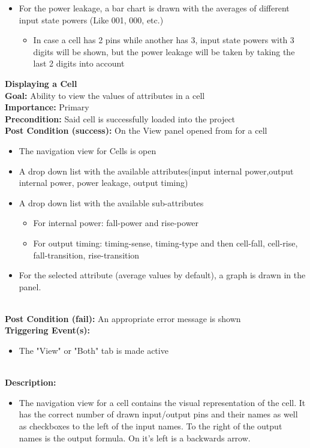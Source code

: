 \documentclass[10pt,a4paper]{report}
\newcommand{\precondition}[1]{
    \textbf{Precondition: } #1 \leavevmode \\
}
\newcommand{\FRDescription}[8]{
    \textbf{#1} \leavevmode \\
    \textbf{Goal: } #2 \leavevmode \\
    \textbf{Importance: } #3 \leavevmode \\
    \precondition{#4}
    \textbf{Post Condition (success): } #5 \leavevmode \\
    \textbf{Post Condition (fail): } #6 \leavevmode \\
    \textbf{Triggering Event(s): } #7 \leavevmode \\
    \textbf{Description: } \leavevmode \\ 
    #8}
\begin{document}
\begin{FR}
{\begin{itemize}
\begin{itemize}
            \item For the power leakage, a bar chart is drawn with the averages of different input state powers (Like 001, 000, etc.)
                \begin{itemize}
                    \item In case a cell has 2 pins while another has 3, input state powers with 3 digits will be shown, but the power leakage will be taken by taking the last 2 digits into account
                \end{itemize}
        \end{itemize}
    \end{itemize}}
    \item \FRDescription{Displaying a Cell}
    {Ability to view the values of attributes in a cell}
    {Primary}
    {Said cell is successfully loaded into the project}
    {On the View panel opened from \label{FR-PREVIOUS} for a cell
    \begin{itemize}
        \item The navigation view for Cells is open
        \item A drop down list with the available attributes(input internal power,output internal power, power leakage, output timing)
        \item A drop down list with the available sub-attributes
        \begin{itemize}
            \item For internal power: fall-power and rise-power
            \item For output timing: timing-sense, timing-type and then cell-fall, cell-rise, fall-transition, rise-transition
        \end{itemize}
        \item For the selected attribute (average values by default), a graph is drawn in the panel.
    \end{itemize}}
    {An appropriate error message is shown}
    {\begin{itemize}
        \item The "View" or "Both" tab is made active
    \end{itemize}}
    {\begin{itemize}
        \item The navigation view for a cell contains the visual representation of the cell. It has the correct number of drawn input/output pins and their names as well as checkboxes to the left of the input names. To the right of the output names is the output formula. On it's left is a backwards arrow.

\end{itemize}}
\end{FR}
\end{document}
